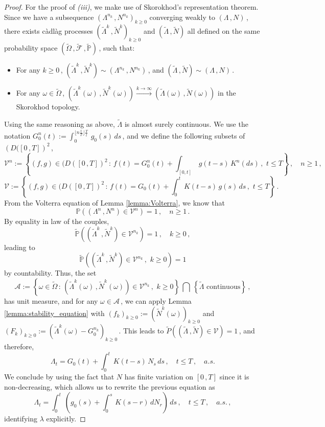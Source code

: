 \documentclass{article}
\newcommand{\1}{\mathbbm{1}}
\numberwithin{equation}{section}
\begin{document}
\begin{proof}
    For the proof of \textit{(iii)}, we make use of Skorokhod's representation theorem. Since we have a subsequence $\left(\Lambda^{n_k}\,, N^{n_k}\right)_{k \geq 0}$ converging weakly to $(\Lambda\,, N)\,$, there exists càdlàg processes $\left(\tilde \Lambda^k\,, \tilde N^k\right)_{k \geq 0}$ and $\left(\tilde \Lambda\,, \tilde N\right)$ all defined on the same probability space $\left(\tilde \Omega\,, \tilde{\mathcal{F}}\,, \tilde{\mathbb{P}}\right)\,$, such that:
    \begin{itemize}
        \item For any $k \geq 0\,$, $\left(\tilde \Lambda^k \,, \tilde N^k\right) \sim \left(\Lambda^{n_k}\,, N^{n_k}\right)\,$, and $\left(\tilde \Lambda\,, \tilde N\right) \sim \left(\Lambda\,, N\right)\,$.
        \item For any $\omega \in \tilde \Omega\,$, $\left(\tilde \Lambda^k(\omega)\,, \tilde N^k(\omega)\right) \overset{k \to \infty}{\longrightarrow} \left( \tilde \Lambda(\omega)\,, \tilde N(\omega)\right)$ in the Skorokhod topology.
    \end{itemize}
    Using the same reasoning as above, $\tilde \Lambda$ is almost surely continuous. We use the notation $G_0^n(t) := \int_0^{\lfloor n \frac{t}{T} \rfloor \frac{T}{t}}\,g_0(s)\,ds\,$, and we define the following subsets of $\left(D([0\,,T]\right)^2\,$,
    $$
    \mathcal V^n := \left\{(f,g) \in (D([0\,,T])^2\,:\, f(t) = G_0^n(t) + \int_{[0,t]}\,g(t-s)\,K^n(ds)\,,\,\,t \leq T  \right\}\,, \quad n \geq 1\,,
    $$
    $$
    \mathcal V := \left\{(f,g) \in (D([0\,,T])^2\,:\,f(t) = G_0(t) + \int_0^t\,K(t-s)\,g(s)\,ds\,,\,\,t\leq T \right\}\,.
    $$
    From the Volterra equation of Lemma \ref{lemma:Volterra}, we know that
    $$
    \mathbb P \left(\left(\Lambda^n\,,N^n\right) \in \mathcal V^n \right) = 1\,, \quad n \geq 1\,.
    $$
    By equality in law of the couples,
    $$
    \tilde{\mathbb P}\left(\left(\tilde \Lambda^k\,, \tilde N^k \right) \in \mathcal V^{n_k}\right) = 1\,, \quad k \geq 0\,,
    $$
    leading to 
    $$
    \tilde{\mathbb P}\left(\left(\tilde \Lambda^k\,, \tilde N^k\right) \in \mathcal V^{n_k}\,, \,\, k \geq 0 \right) = 1
    $$
    by countability. Thus, the set
    $$
    \mathcal A := \left\{\omega \in \tilde \Omega\,:\, \left(\tilde \Lambda^k(\omega)\,, \tilde N^k(\omega)  \right) \in \mathcal V^{n_k}\,,\,\,k\geq0 \right\}\,\bigcap \,\left\{\tilde \Lambda\,\,\text{continuous} \right\}\,,
    $$
    has unit measure, and for any $\omega \in \mathcal A\,$, we can apply Lemma \ref{lemma:stability_equation} with $\left(f_k\right)_{k \geq 0} := \left(\tilde N^k(\omega) \right)_{k \geq 0}$ and $\left(F_k\right)_{k \geq 0} := \left(\tilde \Lambda^k(\omega) - G_0^{n_k}\right)_{k \geq 0}\,$. This leads to $\tilde{P}\left(\left(\tilde \Lambda\,, \tilde N\right) \in \mathcal V \right) = 1\,$, and therefore,
    $$
    \Lambda_t = G_0(t) + \int_0^t \,K(t-s)\,N_s\,ds\,,\quad t \leq T\,, \quad a.s.
    $$
    We conclude by using the fact that $N$ has finite variation on $[0\,,T]$ since it is non-decreasing, which allows us to rewrite the previous equation as 
    $$
    \Lambda_t = \int_0^t\,\left(g_0(s) + \int_0^s\,K(s-r)\,dN_r \right)\,ds\,, \quad t \leq T\,, \quad a.s.\,,
    $$
    identifying $\lambda$ explicitly.



\end{proof}
\end{document}
